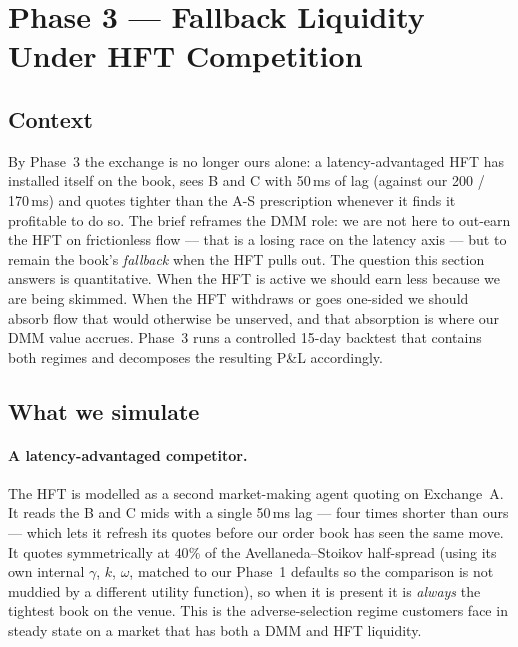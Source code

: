 \section{Phase 3 --- Fallback Liquidity Under HFT Competition}
\label{sec:phase3}

\subsection{Context}

By Phase~3 the exchange is no longer ours alone: a latency-advantaged
HFT has installed itself on the book, sees B and C with 50\,ms of
lag (against our 200 / 170\,ms) and quotes tighter than the A-S
prescription whenever it finds it profitable to do so. The brief
reframes the DMM role: we are not here to out-earn the HFT on
frictionless flow --- that is a losing race on the latency axis ---
but to remain the book's \emph{fallback} when the HFT pulls out.
The question this section answers is quantitative. When the HFT is
active we should earn less because we are being skimmed. When the
HFT withdraws or goes one-sided we should absorb flow that would
otherwise be unserved, and that absorption is where our DMM value
accrues. Phase~3 runs a controlled 15-day backtest that contains
both regimes and decomposes the resulting P\&L accordingly.

\subsection{What we simulate}

\paragraph{A latency-advantaged competitor.} The HFT is modelled as
a second market-making agent quoting on Exchange~A. It reads the
B and C mids with a single 50\,ms lag --- four times shorter than
ours --- which lets it refresh its quotes before our order book has
seen the same move. It quotes symmetrically at $40\%$ of the
Avellaneda--Stoikov half-spread (using its own internal
$\gamma$, $k$, $\omega$, matched to our Phase~1 defaults so the
comparison is not muddied by a different utility function), so when
it is present it is \emph{always} the tightest book on the venue.
This is the adverse-selection regime customers face in steady state
on a market that has both a DMM and HFT liquidity.

